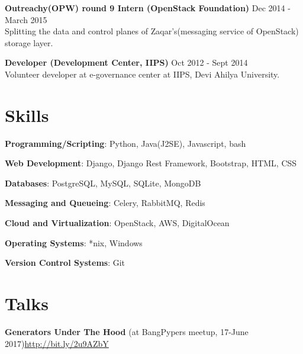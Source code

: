 \documentclass[margin,line]{resume}
\begin{document}
\begin{resume}
\begin{list2}
	\item \textbf{Outreachy(OPW) round 9 Intern (OpenStack Foundation)} \hspace{18mm} Dec 2014 - March 2015 \\ Splitting the data and control planes of Zaqar's(messaging service of OpenStack) storage layer.

	\item \textbf{Developer (Development Center, IIPS)} \hspace{52mm} Oct 2012 - Sept 2014 \\ Volunteer developer at e-governance center at IIPS, Devi Ahilya University.

	\end{list2}

    \section{\mysidestyle Skills} 

    \begin{list2}
	\item \textbf{Programming/Scripting}: \hspace{3mm} Python, Java(J2SE), Javascript, bash
	\item \textbf{Web Development}: \hspace{13mm}  Django, Django Rest Framework, Bootstrap, HTML, CSS
	\item \textbf{Databases}: \hspace{28mm} PostgreSQL, MySQL, SQLite,	MongoDB
	\item \textbf{Messaging and Queueing}: \hspace{2mm} Celery, RabbitMQ, Redis
	\item \textbf{Cloud and Virtualization}: \hspace{1mm} OpenStack, AWS, DigitalOcean
	\item \textbf{Operating Systems}: \hspace{12mm} *nix, Windows
    \item \textbf{Version Control Systems}: \hspace{2mm} Git
	\end{list2}

    \section{\mysidestyle Talks}
    \begin{list2}
    \item \textbf{Generators Under The Hood} (at BangPypers meetup, 17-June 2017)\url{http://bit.ly/2u9AZbY}
    \end{list2}


\end{resume}
\end{document}
